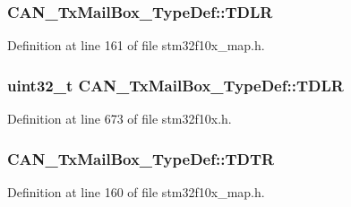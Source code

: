 \subsubsection[{\texorpdfstring{T\+D\+LR}{TDLR}}]{ C\+A\+N\+\_\+\+Tx\+Mail\+Box\+\_\+\+Type\+Def\+::\+T\+D\+LR}\hypertarget{struct_c_a_n___tx_mail_box___type_def_a4f48c25398ee52d9f7fe3cf9b6f1f47b}{}\label{struct_c_a_n___tx_mail_box___type_def_a4f48c25398ee52d9f7fe3cf9b6f1f47b}


Definition at line 161 of file stm32f10x\+\_\+map.\+h.

\subsubsection[{\texorpdfstring{T\+D\+LR}{TDLR}}]{ {\bf uint32\+\_\+t} C\+A\+N\+\_\+\+Tx\+Mail\+Box\+\_\+\+Type\+Def\+::\+T\+D\+LR}\hypertarget{struct_c_a_n___tx_mail_box___type_def_a408c96501b1cc8bd527432736d132a39}{}\label{struct_c_a_n___tx_mail_box___type_def_a408c96501b1cc8bd527432736d132a39}


Definition at line 673 of file stm32f10x.\+h.

\subsubsection[{\texorpdfstring{T\+D\+TR}{TDTR}}]{ C\+A\+N\+\_\+\+Tx\+Mail\+Box\+\_\+\+Type\+Def\+::\+T\+D\+TR}\hypertarget{struct_c_a_n___tx_mail_box___type_def_a04274cc74d7f4e83e1775876b321365b}{}\label{struct_c_a_n___tx_mail_box___type_def_a04274cc74d7f4e83e1775876b321365b}


Definition at line 160 of file stm32f10x\+\_\+map.\+h.

